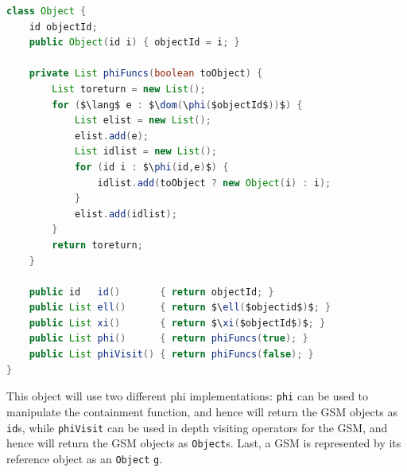\begin{lstlisting}[language=Java,mathescape=true]
class Object {
	id objectId;
	public Object(id i) { objectId = i; }
	
	private List phiFuncs(boolean toObject) {
		List toreturn = new List();
		for ($\lang$ e : $\dom(\phi($objectId$))$) {
			List elist = new List();
			elist.add(e);
			List idlist = new List();
			for (id i : $\phi(id,e)$) {
				idlist.add(toObject ? new Object(i) : i);
			}
			elist.add(idlist);
		}
		return toreturn;
	}
	
	public id   id()       { return objectId; }
	public List ell()      { return $\ell($objectid$)$; }
	public List xi()       { return $\xi($objectId$)$; }
	public List phi()      { return phiFuncs(true); }
	public List phiVisit() { return phiFuncs(false); }
}
\end{lstlisting}

This object will use two different phi implementations: \texttt{phi} can be used to manipulate the containment function, and hence will return the GSM objects as \texttt{id}s, while \texttt{phiVisit} can be used in depth visiting operators for the GSM, and hence will return the GSM objects as \texttt{Object}s. Last, a GSM is represented by its reference object as an \texttt{Object} \texttt{g}. 

